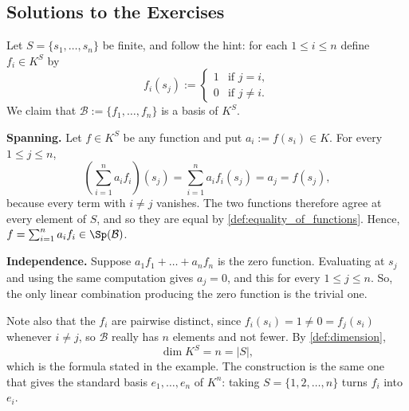 \subsection{Solutions to the Exercises}
\label{sec:solutions_bases_part_b}

\begin{exercisesolution*}
\label{sol:basis_of_function_space}
Let $S = \{s_1, \dots, s_n\}$ be finite, and follow the hint: for each $1 \le i \le n$ define $f_i \in K^S$ by
\[
f_i(s_j) :=
\begin{cases}
1 & \text{if } j = i, \\
0 & \text{if } j \ne i.
\end{cases}
\]
We claim that $\mathcal{B} := \{f_1, \dots, f_n\}$ is a basis of $K^S$.

\textbf{Spanning.} Let $f \in K^S$ be any function and put $a_i := f(s_i) \in K$. For every $1 \le j \le n$,
\[
\left( \sum_{i=1}^{n} a_i f_i \right)(s_j) = \sum_{i=1}^{n} a_i f_i(s_j) = a_j = f(s_j),
\]
because every term with $i \ne j$ vanishes. The two functions therefore agree at every element of $S$, and so they are equal by \cref{def:equality_of_functions}. Hence, $f = \sum_{i=1}^{n} a_i f_i \in \Sp(\mathcal{B})$.

\textbf{Independence.} Suppose $a_1 f_1 + \dots + a_n f_n$ is the zero function. Evaluating at $s_j$ and using the same computation gives $a_j = 0$, and this for every $1 \le j \le n$. So, the only linear combination producing the zero function is the trivial one.

Note also that the $f_i$ are pairwise distinct, since $f_i(s_i) = 1 \ne 0 = f_j(s_i)$ whenever $i \ne j$, so $\mathcal{B}$ really has $n$ elements and not fewer. By \cref{def:dimension},
\[
\dim K^S = n = |S|,
\]
which is the formula stated in the example. The construction is the same one that gives the standard basis $e_1, \dots, e_n$ of $K^n$: taking $S = \{1, 2, \dots, n\}$ turns $f_i$ into $e_i$.
\end{exercisesolution*}



